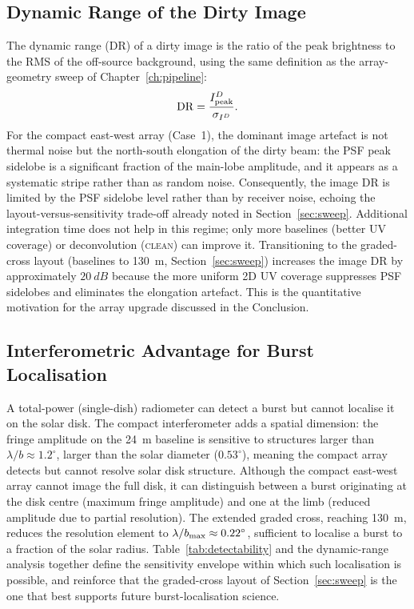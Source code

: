 \subsection{Dynamic Range of the Dirty Image}

The dynamic range (DR) of a dirty image is the ratio of the peak brightness to the
RMS of the off-source background, using the same definition as the array-geometry
sweep of Chapter~\ref{ch:pipeline}:
\begin{equation}
  \mathrm{DR} = \frac{I^D_{\rm peak}}{\sigma_{I^D}}.
  \label{eq:dynamic-range}
\end{equation}
For the compact east-west array (Case~1), the dominant image artefact is not
thermal noise but the north-south elongation of the dirty beam: the PSF peak
sidelobe is a significant fraction of the main-lobe amplitude, and it appears
as a systematic stripe rather than as random noise. Consequently, the image DR
is limited by the PSF sidelobe level rather than by receiver noise, echoing the
layout-versus-sensitivity trade-off already noted in Section~\ref{sec:sweep}.
Additional integration time does not help in this regime; only more baselines
(better UV coverage) or deconvolution (\textsc{clean}) can improve it.
Transitioning to the graded-cross layout (baselines to \SI{130}{\metre},
Section~\ref{sec:sweep}) increases the image DR by approximately
$20~\si{dB}$ because the more uniform 2D UV coverage suppresses PSF sidelobes
and eliminates the elongation artefact. This is the quantitative motivation for the
array upgrade discussed in the Conclusion.

\subsection{Interferometric Advantage for Burst Localisation}

A total-power (single-dish) radiometer can detect a burst but cannot localise it
on the solar disk. The compact interferometer adds a spatial dimension: the
fringe amplitude on the \SI{24}{\metre} baseline is sensitive to structures larger than
$\lambda/b\approx1.2^\circ$, larger than the solar diameter ($0.53^\circ$), meaning the
compact array detects but cannot resolve solar disk structure.
Although the compact east-west array cannot image the full disk, it can
distinguish between a burst originating at the disk centre (maximum fringe
amplitude) and one at the limb (reduced amplitude due to partial resolution). The
extended graded cross, reaching \SI{130}{\metre}, reduces the resolution element
to $\lambda/b_{\rm max}\approx0.22^\circ$, sufficient to localise a burst to a
fraction of the solar radius. Table~\ref{tab:detectability} and the dynamic-range
analysis together define the sensitivity envelope within which such localisation is
possible, and reinforce that the graded-cross layout of Section~\ref{sec:sweep} is
the one that best supports future burst-localisation science.

